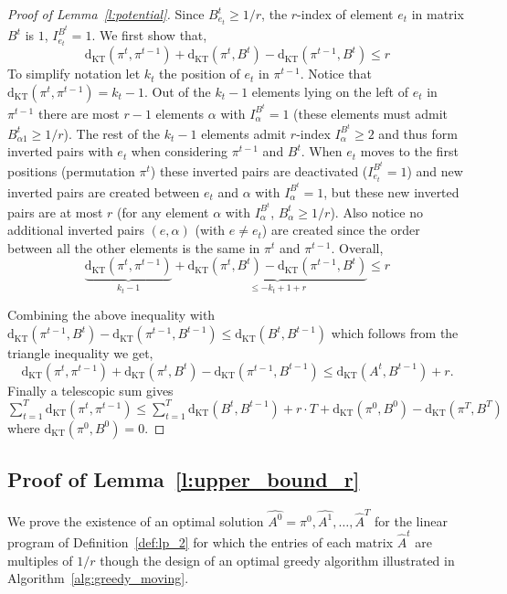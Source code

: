 \begin{proof}[Proof of Lemma~\ref{l:potential}]
Since $B_{e_t}^t \geq 1/r$, the $r$-index of element $e_t$ in matrix $B^t$ is $1$, $I_{e_t}^{B^{t}} = 1$. We first show that, $$\mathrm{d}_{\mathrm{KT}}\left(\pi^t, \pi^{t-1}\right)
+ \mathrm{d}_{\mathrm{KT}}\left(\pi^t, B^{t}\right)
- \mathrm{d}_{\mathrm{KT}}\left(\pi^{t-1}, B^{t}\right) \leq r$$ 
To simplify notation let $k_t$ the position of $e_t$ in $\pi^{t-1}$. Notice that $\mathrm{d}_{\mathrm{KT}}\left(\pi^t, \pi^{t-1}\right) = k_t -1$. Out of the $k_t - 1$ elements lying on the left of $e_t$ in $\pi^{t-1}$ there are most $r-1$ elements $\alpha$ with $I_{\alpha}^{B^t} = 1$ (these elements must admit $B_{\alpha 1}^t \geq 1/r$). The rest of the $k_t - 1$ elements admit $r$-index $I_{\alpha}^{B^t} \geq 2$ and thus form inverted pairs with $e_t$ when considering $\pi^{t-1}$ and $B^t$. When $e_t$ moves to the first positions (permutation $\pi^t$) these inverted pairs are deactivated ($I_{e_t}^{B^t} = 1$) and new inverted pairs are created between $e_t$ and $\alpha$ with $I_{\alpha}^{B^t} = 1$, but these new inverted pairs are at most $r$ (for any element $\alpha$ with $I_{\alpha}^{B^t}$, $B^t_{\alpha} \geq 1/r$). Also notice no additional inverted pairs $(e,\alpha)$ (with $e \neq e_t$) are created since the order between all the other elements is the same in $\pi^t$ and $\pi^{t-1}$. Overall,
$$\underbrace{\mathrm{d}_{\mathrm{KT}}\left(\pi^t, \pi^{t-1}\right)}_{ k_t - 1}
+ \underbrace{\mathrm{d}_{\mathrm{KT}}\left(\pi^t, B^{t}\right)
- \mathrm{d}_{\mathrm{KT}}\left(\pi^{t-1}, B^{t}\right)}_{\leq -k_t + 1 + r} \leq r$$

\noindent Combining the above inequality with $\mathrm{d}_{\mathrm{KT}}\left(\pi^{t-1}, B^{t}\right)
- \mathrm{d}_{\mathrm{KT}}\left(\pi^{t-1}, B^{t-1}\right) \leq \mathrm{d}_{\mathrm{KT}}\left(B^t, B^{t-1}\right)$ which follows from the triangle inequality we get,
$$\mathrm{d}_{\mathrm{KT}}\left(\pi^t, \pi^{t-1}\right)
+ \mathrm{d}_{\mathrm{KT}}\left(\pi^t, B^{t}\right)
- \mathrm{d}_{\mathrm{KT}}\left(\pi^{t-1}, B^{t-1}\right) \leq \mathrm{d}_{\mathrm{KT}}\left(A^{t}, B^{t-1}\right) +  r.$$
Finally a telescopic sum gives $\sum_{t=1}^T \mathrm{d}_{\mathrm{KT}}\left(\pi^t, \pi^{t-1}\right) \leq \sum_{t=1}^T \mathrm{d}_{\mathrm{KT}}\left(B^t, B^{t-1}\right)
+ r\cdot T + \mathrm{d}_{\mathrm{KT}}(\pi^0,B^0) - \mathrm{d}_{\mathrm{KT}}(\pi^T,B^T)
$ where $\mathrm{d}_{\mathrm{KT}}(\pi^0,B^0) = 0$.
\end{proof}


\subsection{Proof of Lemma~\ref{l:upper_bound_r}}\label{sub:greedy_2}
We prove the existence of an optimal solution $\hat{A^0} = \pi^0,\hat{A^1},\ldots,\hat{A}^T$ for the linear program of Definition~\ref{def:lp_2} for which the entries of each matrix $\hat{A}^t$ are multiples of $1/r$ though the design of an optimal greedy algorithm illustrated in Algorithm~\ref{alg:greedy_moving}.  

